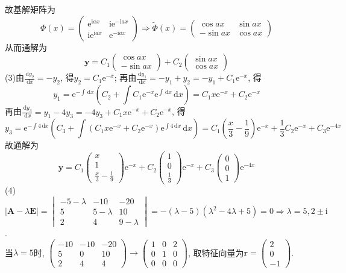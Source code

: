 \documentclass[titlepage,11pt,a4paper,twoside]{report}
\makeatletter
\newcommand\diff{\,\mathrm{d}}
\newcommand\e{\mathrm{e}}
\newcommand\ii{\mathrm{i}}
\newcommand\bmitPhi{\bm{\varPhi}}
\newenvironment{solve}{\par
	\pushQED{\qed}%
	\normalfont \topsep1\p@\@plus6\p@\relax
	\trivlist
	\item\relax
	{\hspace*{\parindent}{\heiti 解}\@addpunct{:}}\hspace\labelsep\ignorespaces
}{%
	\popQED\endtrivlist\@endpefalse
}
\makeatother
\begin{document}
\begin{solve}
故基解矩阵为
\[\bmitPhi(x)=\begin{pmatrix}\e^{\ii ax}&\ii\e^{-\ii ax}\\\ii\e^{\ii ax}&\e^{-\ii ax}\end{pmatrix}\Rightarrow\widetilde{\bmitPhi}(x)=\begin{pmatrix}\cos ax&\sin ax\\-\sin ax&\cos ax\end{pmatrix}\]
从而通解为\[\bm{y}=C_1\begin{pmatrix}\cos ax\\-\sin ax\end{pmatrix}+C_2\begin{pmatrix}\sin ax\\\cos ax\end{pmatrix}\]
(3)由$\displaystyle\frac{\diff y_2}{\diff x}=-y_2$, 得$y_2=C_1\e^{-x}$; 再由$\displaystyle\frac{\diff y_1}{\diff x}=-y_1+y_2=-y_1+C_1\e^{-x}$, 得
\[\displaystyle y_1=\e^{-\int\diff x}\left(C_2+\int C_1\e^{-x}\e^{\int\diff x}\diff x\right)=C_1x\e^{-x}+C_2\e^{-x}\]
再由$\displaystyle\frac{\diff y_3}{\diff x}=y_1-4y_3=-4y_3+C_1x\e^{-x}+C_2\e^{-x}$, 得
\[\displaystyle y_3=\e^{-\int4\diff x}\left(C_3+\int\left(C_1x\e^{-x}+C_2\e^{-x}\right)\e^{\int4\diff x}\diff x\right)=C_1\left(\frac{x}{3}-\frac{1}{9}\right)\e^{-x}+\frac{1}{3}C_2\e^{-x}+C_3\e^{-4x}\]
故通解为
\[\bm{y}=C_1\begin{pmatrix}x\\1\\\frac{x}{3}-\frac{1}{9}\end{pmatrix}\e^{-x}+C_2\begin{pmatrix}1\\0\\\frac{1}{3}\end{pmatrix}\e^{-x}+C_3\begin{pmatrix}0\\0\\1\end{pmatrix}\e^{-4x}\]
(4)$\displaystyle|\bm{A}-\lambda\bm{E}|=\begin{vmatrix}-5-\lambda&-10&-20\\5&5-\lambda&10\\2&4&9-\lambda\end{vmatrix}=-(\lambda-5)(\lambda^2-4\lambda+5)=0\Rightarrow\lambda=5,2\pm\ii$.\\
当$\lambda=5$时, $\begin{pmatrix}-10&-10&-20\\5&0&10\\2&4&4\end{pmatrix}\to\begin{pmatrix}1&0&2\\0&1&0\\0&0&0\end{pmatrix}$, 取特征向量为$\bm{r}=\begin{pmatrix}2\\0\\-1\end{pmatrix}$.\\

\end{solve}
\end{document}
